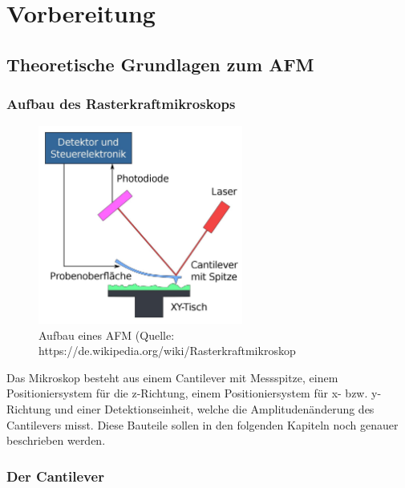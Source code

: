 \chapter{Vorbereitung}

\section{Theoretische Grundlagen zum AFM}
       
 \subsection{Aufbau des Rasterkraftmikroskops}
\begin{figure}[h!]
    \centering
    \includegraphics[width=0.6\textwidth]{Abb/afm.jpg}
    \caption{Aufbau eines AFM (Quelle: https://de.wikipedia.org/wiki/Rasterkraftmikroskop}
    \label{afm}
\end{figure}

Das Mikroskop besteht aus einem Cantilever mit Messspitze, einem Positioniersystem für die z-Richtung, einem Positioniersystem für x- bzw. y-Richtung und einer Detektionseinheit, welche die Amplitudenänderung des Cantilevers misst. 
Diese Bauteile sollen in den folgenden Kapiteln noch genauer beschrieben werden. 

 \subsection{Der Cantilever}
 
